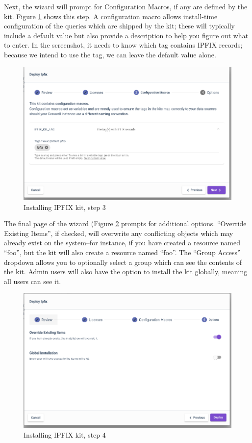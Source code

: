 Next, the wizard will prompt for Configuration Macros, if any are defined by the kit. Figure \ref{fig:wizard3} shows this step. A configuration macro allows install-time configuration of the queries which are shipped by the kit; these will typically include a default value but also provide a description to help you figure out what to enter. In the screenshot, it needs to know which tag contains IPFIX records; because we intend to use the  tag, we can leave the default value alone.

\begin{figure}
	\includegraphics[width=0.6\linewidth]{images/wizard3.png}
	\caption{Installing IPFIX kit, step 3}
	\label{fig:wizard3}
\end{figure}

The final page of the wizard (Figure \ref{fig:wizard4} prompts for additional options. ``Override Existing Items'', if checked, will overwrite any conflicting objects which may already exist on the system--for instance, if you have created a resource named ``foo'', but the kit will also create a resource named ``foo''. The ``Group Access'' dropdown allows you to optionally select a group which can see the contents of the kit. Admin users will also have the option to install the kit globally, meaning all users can see it.

\begin{figure}
	\includegraphics[width=0.6\linewidth]{images/wizard4.png}
	\caption{Installing IPFIX kit, step 4}
	\label{fig:wizard4}
\end{figure}

